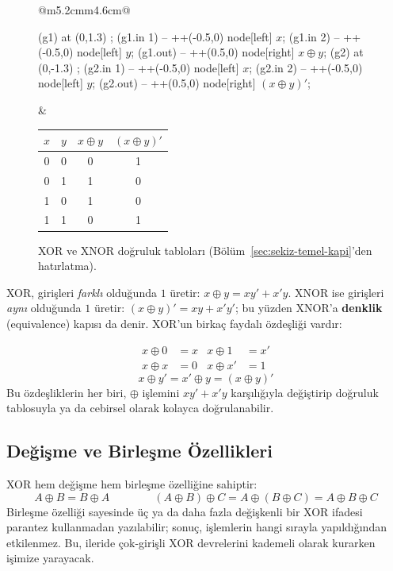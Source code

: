 \begin{figure}[H]
\centering
\begin{tabular}{@{}m{5.2cm}m{4.6cm}@{}}
\begin{circuitikz}[scale=0.85, font=\small]
 (g1) at (0,1.3) {};
\draw (g1.in 1) -- ++(-0.5,0) node[left] {$x$};
\draw (g1.in 2) -- ++(-0.5,0) node[left] {$y$};
\draw (g1.out) -- ++(0.5,0) node[right] {$x\oplus y$};
 (g2) at (0,-1.3) {};
\draw (g2.in 1) -- ++(-0.5,0) node[left] {$x$};
\draw (g2.in 2) -- ++(-0.5,0) node[left] {$y$};
\draw (g2.out) -- ++(0.5,0) node[right] {$(x\oplus y)'$};
\end{circuitikz}
&
\begin{tabular}{cc|cc}
\toprule
$x$&$y$&$x\oplus y$&$(x\oplus y)'$\\
\midrule
0&0&0&1\\0&1&1&0\\1&0&1&0\\1&1&0&1\\
\bottomrule
\end{tabular}
\end{tabular}
\caption{XOR ve XNOR doğruluk tabloları (Bölüm~\ref{sec:sekiz-temel-kapi}'den
hatırlatma).}
\label{fig:xorxnor-hatirlatma}
\end{figure}

XOR, girişleri \emph{farklı} olduğunda $1$ üretir: $x\oplus y=xy'+x'y$. XNOR ise
girişleri \emph{aynı} olduğunda $1$ üretir: $(x\oplus y)'=xy+x'y'$; bu yüzden XNOR'a
\textbf{denklik} (equivalence) kapısı da denir. XOR'un birkaç faydalı özdeşliği vardır:

\begin{tanim}
\begin{align*}
x\oplus 0 &= x & x\oplus 1 &= x' \\
x\oplus x &= 0 & x\oplus x' &= 1
\end{align*}
\[
x\oplus y' = x'\oplus y = (x\oplus y)'
\]
Bu özdeşliklerin her biri, $\oplus$ işlemini $xy'+x'y$ karşılığıyla değiştirip
doğruluk tablosuyla ya da cebirsel olarak kolayca doğrulanabilir.
\end{tanim}

\subsection{Değişme ve Birleşme Özellikleri}\label{sec:xorxnor-degisme-birlesme}
XOR hem değişme hem birleşme özelliğine sahiptir:
\[
A\oplus B = B\oplus A \qquad\qquad (A\oplus B)\oplus C = A\oplus(B\oplus C) = A\oplus B\oplus C
\]
Birleşme özelliği sayesinde üç ya da daha fazla değişkenli bir XOR ifadesi parantez
kullanmadan yazılabilir; sonuç, işlemlerin hangi sırayla yapıldığından etkilenmez. Bu,
ileride çok-girişli XOR devrelerini kademeli olarak kurarken işimize yarayacak.

